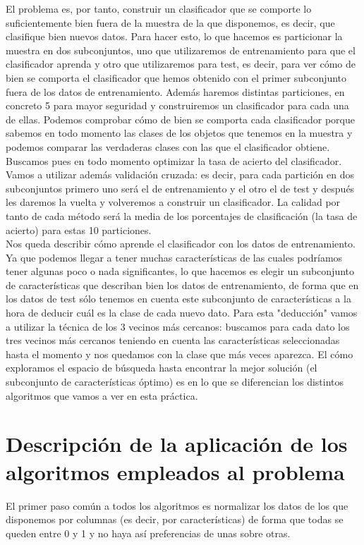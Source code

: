 \documentclass[12pt]{article}
\begin{document}
El problema es, por tanto, construir un clasificador que se comporte lo suficientemente bien fuera de la muestra de la que disponemos, es decir, que clasifique bien nuevos datos. Para hacer esto, lo que hacemos es particionar la muestra en dos subconjuntos, uno que utilizaremos de entrenamiento para que el clasificador aprenda y otro que utilizaremos para test, es decir, para ver cómo de bien se comporta el clasificador que hemos obtenido con el primer subconjunto fuera de los datos de entrenamiento. Además haremos distintas particiones, en concreto 5 para mayor seguridad y construiremos un clasificador para cada una de ellas. Podemos comprobar cómo de bien se comporta cada clasificador porque sabemos en todo momento las clases de los objetos que tenemos en la muestra y podemos comparar las verdaderas clases con las que el clasificador obtiene.\\
Buscamos pues en todo momento optimizar la tasa de acierto del clasificador.\\
Vamos a utilizar además validación cruzada: es decir, para cada partición en dos subconjuntos primero uno será el de entrenamiento y el otro el de test y después les daremos la vuelta y volveremos a construir un clasificador. La calidad por tanto de cada método será la media de los porcentajes de clasificación (la tasa de acierto) para estas 10 particiones.\\

Nos queda describir cómo aprende el clasificador con los datos de entrenamiento. Ya que podemos llegar a tener muchas características de las cuales podríamos tener algunas poco o nada significantes, lo que hacemos es elegir un subconjunto de características que describan bien los datos de entrenamiento, de forma que en los datos de test sólo tenemos en cuenta este subconjunto de características a la hora de deducir cuál es la clase de cada nuevo dato. Para esta "deducción" vamos a utilizar la técnica de los 3 vecinos más cercanos: buscamos para cada dato los tres vecinos más cercanos teniendo en cuenta las características seleccionadas hasta el momento y nos quedamos con la clase que más veces aparezca. El cómo exploramos el espacio de búsqueda hasta encontrar la mejor solución (el subconjunto de características óptimo) es en lo que se diferencian los distintos algoritmos que vamos a ver en esta práctica.

\newpage

\section{Descripción de la aplicación de los algoritmos empleados al problema}
El primer paso común a todos los algoritmos es normalizar los datos de los que disponemos por columnas (es decir, por características) de forma que todas se queden entre 0 y 1 y no haya así preferencias de unas sobre otras.\\
\end{document}
